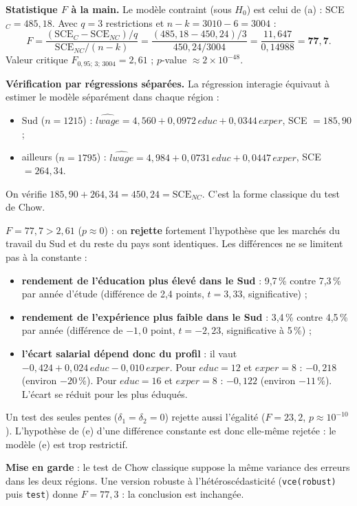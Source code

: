 \documentclass[11pt,a4paper]{article}
\begin{document}
\textbf{Statistique $F$ à la main.} Le modèle contraint (sous $H_0$) est celui de (a) : SCE$_C=485{,}18$. Avec $q=3$ restrictions et $n-k=3010-6=3004$ :
\[
F=\frac{(\text{SCE}_C-\text{SCE}_{NC})/q}{\text{SCE}_{NC}/(n-k)}=\frac{(485{,}18-450{,}24)/3}{450{,}24/3004}=\frac{11{,}647}{0{,}14988}=\mathbf{77{,}7}.
\]
Valeur critique $F_{0{,}95;\,3;\,3004}=2{,}61$ ; $p$-value $\approx2\times10^{-48}$.

\textbf{Vérification par régressions séparées.} La régression interagie équivaut à estimer le modèle séparément dans chaque région :
\begin{itemize}[nosep]
\item Sud ($n=1215$) : $\widehat{lwage}=4{,}560+0{,}0972\,educ+0{,}0344\,exper$, SCE $=185{,}90$ ;
\item ailleurs ($n=1795$) : $\widehat{lwage}=4{,}984+0{,}0731\,educ+0{,}0447\,exper$, SCE $=264{,}34$.
\end{itemize}
On vérifie $185{,}90+264{,}34=450{,}24=\text{SCE}_{NC}$. C'est la forme classique du test de Chow.

\begin{reponse}
$F=77{,}7>2{,}61$ ($p\approx0$) : on \textbf{rejette} fortement l'hypothèse que les marchés du travail du Sud et du reste du pays sont identiques. Les différences ne se limitent pas à la constante :
\begin{itemize}[nosep]
\item \textbf{rendement de l'éducation plus élevé dans le Sud} : 9,7\,\% contre 7,3\,\% par année d'étude (différence de 2,4 points, $t=3{,}33$, significative) ;
\item \textbf{rendement de l'expérience plus faible dans le Sud} : 3,4\,\% contre 4,5\,\% par année (différence de $-1{,}0$ point, $t=-2{,}23$, significative à 5\,\%) ;
\item \textbf{l'écart salarial dépend donc du profil} : il vaut $-0{,}424+0{,}024\,educ-0{,}010\,exper$. Pour $educ=12$ et $exper=8$ : $-0{,}218$ (environ $-20\,\%$). Pour $educ=16$ et $exper=8$ : $-0{,}122$ (environ $-11\,\%$). L'écart se réduit pour les plus éduqués.
\end{itemize}
Un test des seules pentes ($\delta_1=\delta_2=0$) rejette aussi l'égalité ($F=23{,}2$, $p\approx10^{-10}$). L'hypothèse de (e) d'une différence constante est donc elle-même rejetée : le modèle (e) est trop restrictif.

\textbf{Mise en garde} : le test de Chow classique suppose la même variance des erreurs dans les deux régions. Une version robuste à l'hétéroscédasticité (\texttt{vce(robust)} puis \texttt{test}) donne $F=77{,}3$ : la conclusion est inchangée.
\end{reponse}
\end{document}
